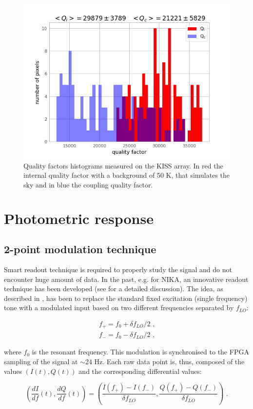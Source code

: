\documentclass[twocolumn,traditabstract]{aa}\\
\begin{document}
\begin{figure}[htf]
	\centering
	\includegraphics[width=.5\textwidth]{3.acqui/Q_hist.png}
	\caption{Quality factors histograms measured on the KISS array. In red the internal quality factor with a background of 50 K, that simulates the sky and in blue the coupling quality factor.}
	\label{fig:hist}
\end{figure}

\section{Photometric response}
\label{sec:photo}

\subsection{2-point modulation technique}
\label{2-point}
Smart readout technique is required to properly study the signal and do not encounter huge amount of data. In the past, e.g. for NIKA, an innovative readout technique has been developed (see \cite{Calvo2013} for a detailed discussion). 
The idea, as described in \cite{Catalano2014} , has been to replace the standard fixed excitation (single frequency) tone with a modulated input based on two different frequencies separated by $f_{LO}$: 

\begin{equation}
\begin{align}
f_+ = f_0 + \delta f_{LO}/2 \text{ ,}
\\
f_- = f_0 - \delta f_{LO}/2 \text{ ,}
\end{align}
\end{equation}

\noindent where $f_0$ is the resonant frequency. This modulation is synchronised to the FPGA sampling of the signal at $\sim$24 Hz. Each raw data point is, thus, composed of the values $(I(t), Q(t))$ and the corresponding differential values:

\begin{equation}
\left( \frac{dI}{df}(t),\frac{dQ}{df}(t) \right) = \left( \frac{I(f_+)-I(f_-)}{\delta f_{LO}}, \frac{Q(f_+)-Q(f_-)}{\delta f_{LO}} \right) \text{ .}
\label{eq:didq}
\end{equation}
\end{document}
